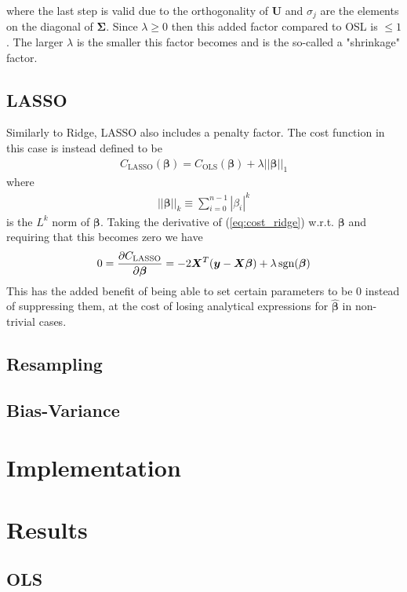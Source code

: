 \documentclass[%
reprint,
amsmath,amssymb,
aps,
]{revtex4-2}
\begin{document}
where the last step is valid due to the orthogonality of $\bm U$ and $\sigma_j$ are the elements on the diagonal of $\bm\Sigma$. Since $\lambda\geq0$ then this added factor compared to OSL is $\leq1$. The larger $\lambda$ is the smaller this factor becomes and is the so-called a "shrinkage" factor. 

\subsection{LASSO}
Similarly to Ridge, LASSO also includes a penalty factor. The cost function in this case is instead defined to be
\begin{align}
	C_\text{LASSO}(\bm\beta)=C_\text{OLS}(\bm\beta)+\lambda||\bm\beta||_1
	\label{eq:cost_ridge}
\end{align}
where
\begin{align*}
	||\bm\beta||_k\equiv\sum_{i=0}^{n-1}|\beta_i|^k
\end{align*}
is the $L^k$ norm of $\bm\beta$. Taking the derivative of (\ref{eq:cost_ridge}) w.r.t. $\bm \beta$ and requiring that this becomes zero we have
\begin{align}
	0=\pdv{C_\text{LASSO}}{\bm\beta}=-2\bm X^T(\bm y-\bm X\bm\beta)+\lambda\,\text{sgn}(\bm\beta)
\end{align}
This has the added benefit of being able to set certain parameters to be $0$ instead of suppressing them, at the cost of losing analytical expressions for $\hat{\bm\beta}$ in non-trivial cases.

\subsection{Resampling}

\subsection{Bias-Variance}

\section{Implementation}

\section{Results}

\subsection{OLS}
\end{document}
